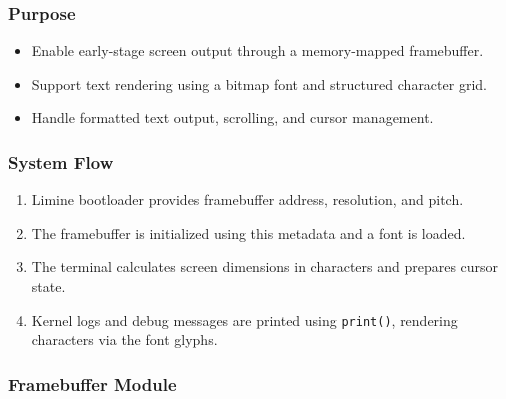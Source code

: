 \documentclass[12pt]{extarticle}
\begin{document}
\subsubsection*{Purpose}
\begin{itemize}
    \item Enable early-stage screen output through a memory-mapped framebuffer.
    \item Support text rendering using a bitmap font and structured character grid.
    \item Handle formatted text output, scrolling, and cursor management.
\end{itemize}

\subsubsection*{System Flow}
\begin{enumerate}
    \item Limine bootloader provides framebuffer address, resolution, and pitch.
    \item The framebuffer is initialized using this metadata and a font is loaded.
    \item The terminal calculates screen dimensions in characters and prepares cursor state.
    \item Kernel logs and debug messages are printed using \texttt{print()}, rendering characters via the font glyphs.
\end{enumerate}

\subsubsection*{Framebuffer Module}
\end{document}
